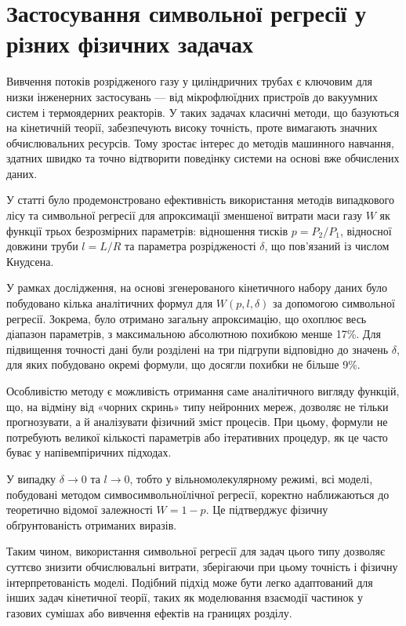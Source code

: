 \documentclass[14pt,a4paper,titlepage,oneside]{book}
\numberwithin{equation}{part}
\begin{document}
\section{Застосування символьної регресії у різних фізичних задачах}



Вивчення потоків розрідженого газу у циліндричних трубах є ключовим для низки інженерних застосувань — від мікрофлюїдних пристроїв до вакуумних систем і термоядерних реакторів. У таких задачах класичні методи, що базуються на кінетичній теорії, забезпечують високу точність, проте вимагають значних обчислювальних ресурсів. Тому зростає інтерес до методів машинного навчання, здатних швидко та точно відтворити поведінку системи на основі вже обчислених даних.

У статті \cite{ml_sr_comp} було продемонстровано ефективність використання методів випадкового лісу та символьної регресії для апроксимації зменшеної витрати маси газу $W$ як функції трьох безрозмірних параметрів: відношення тисків $p = P_2/P_1$, відносної довжини труби $l = L/R$ та параметра розрідженості $\delta$, що пов'язаний із числом Кнудсена.

У рамках  дослідження, на основі згенерованого кінетичного набору даних було побудовано кілька аналітичних формул для $W(p, l, \delta)$ за допомогою символьної  регресії. Зокрема, було отримано загальну апроксимацію, що охоплює весь діапазон параметрів, з максимальною абсолютною похибкою менше 17\%. Для підвищення точності дані були розділені на три підгрупи відповідно до значень $\delta$, для яких побудовано окремі формули, що досягли похибки не більше 9\%.

Особливістю методу є можливість отримання саме аналітичного вигляду функцій, що, на відміну від «чорних скринь» типу нейронних мереж, дозволяє не тільки прогнозувати, а й аналізувати фізичний зміст процесів. При цьому, формули не потребують великої кількості параметрів або ітеративних процедур, як це часто буває у напівемпіричних підходах.

У випадку $\delta \rightarrow 0$ та $l \rightarrow 0$, тобто у вільномолекулярному режимі, всі моделі, побудовані методом симвосимвольноїлічної регресії, коректно наближаються до теоретично відомої залежності $W = 1 - p$. Це підтверджує фізичну обґрунтованість отриманих виразів.

Таким чином, використання символьної регресії для задач цього типу дозволяє суттєво знизити обчислювальні витрати, зберігаючи при цьому точність і фізичну інтерпретованість моделі. Подібний підхід може бути легко адаптований для інших задач кінетичної теорії, таких як моделювання взаємодії частинок у газових сумішах або вивчення ефектів на границях розділу.
\end{document}
